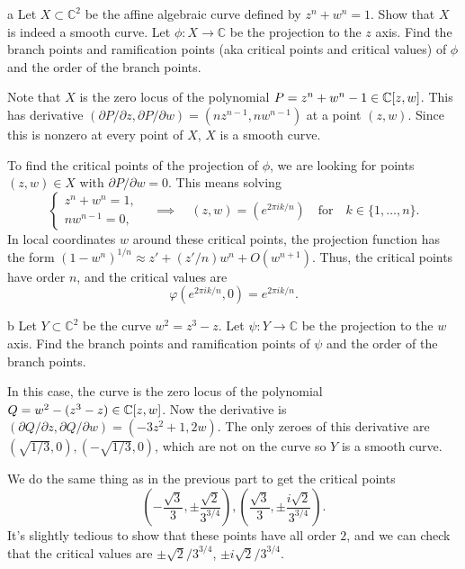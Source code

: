 \documentclass{pset}
\begin{document}
\begin{parts}
  \begin{part}{a}
  Let $X \subset \mathbb{C}^2$ be the affine algebraic curve defined by $z^n + w^n = 1$. Show that $X$ is indeed a smooth curve. Let $\phi : X \rightarrow \mathbb{C}$ be the projection to the $z$ axis. Find the branch points and ramification points (aka critical points and critical values) of $ \phi $ and the order of the branch points.
  \end{part}

  Note that $X$ is the zero locus of the polynomial $P =z^n+w^n-1\in \mathbb{C}[z, w]$. This has derivative $(\partial P/\partial z, \partial P/\partial w)=(nz^{n-1}, nw^{n-1})$ at a point $(z,w)$. Since this is nonzero at every point of $X$, $X$ is a smooth curve.

  To find the critical points of the projection of $\phi$, we are looking for points $(z,w)\in X$ with $\partial P/\partial w = 0$. This means solving
  \[
    \begin{cases}
      z^n + w^n=1,\\ nw^{n-1}=0,
    \end{cases} \quad\implies \quad (z,w) = (e^{2\pi i k/n})\quad\textrm{for}\quad k\in \{1, \ldots, n\}.
  \]
  In local coordinates $w$ around these critical points, the projection function has the form $(1-w^n)^{1/n}\approx z' + (z'/n)w^n + O(w^{n+1})$. Thus, the critical points have order $n$, and the critical values are
  \[
  \varphi(e^{2\pi i k / n}, 0) = e^{2\pi i k /n}.
  \]

  \begin{part}{b}
  Let $ Y \subset \mathbb{C}^2 $ be the curve $ w^2 = z^3 - z $. Let $ \psi : Y \rightarrow \mathbb{C} $ be the projection to the $ w $ axis. Find the branch points and ramification points of $ \psi $ and the order of the branch points.
  \end{part}
  In this case, the curve is the zero locus of the polynomial $Q = w^2-(z^3-z)\in \mathbb{C}[z, w]$. Now the derivative is $(\partial Q/\partial z, \partial Q/\partial w)=(-3z^2+1, 2w)$. The only zeroes of this derivative are $(\sqrt{1/3}, 0), (-\sqrt{1/3}, 0)$, which are not on the curve so $Y$ is a smooth curve.

  We do the same thing as in the previous part to get the critical points 
  \[
    \left(-\frac{\sqrt{3}}{3}, \pm\frac{\sqrt{2}}{3^{3/4}}\right), 
    \left(\frac{\sqrt{3}}{3}, \pm\frac{i\sqrt{2}}{3^{3/4}}\right).
  \]
  It's slightly tedious to show that these points have all order $2$, and we can check that the critical values are $\pm \sqrt{2}/3^{3/4}$, $\pm i\sqrt{2}/3^{3/4}$.
\end{parts}
\end{document}
